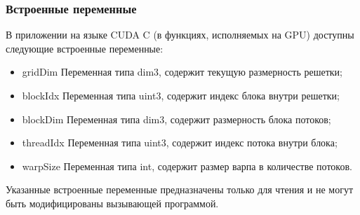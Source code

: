 \documentclass[a4paper, final]{article}
\begin{document}
\subsubsection{Встроенные переменные} 
В приложении на языке CUDA C (в функциях, 
исполняемых на GPU) доступны следующие встроенные переменные:
\begin{itemize}
    \item gridDim Переменная типа dim3, содержит текущую размерность решетки; 
    \item blockIdx Переменная типа uint3, содержит индекс блока внутри решетки; 
    \item blockDim Переменная типа dim3, содержит размерность блока потоков;
    \item threadIdx Переменная типа uint3, содержит индекс потока внутри блока; 
    \item warpSize Переменная типа int, содержит размер варпа в количестве 
    потоков.
\end{itemize}
Указанные встроенные переменные предназначены только для чтения и не 
могут быть модифицированы вызывающей программой.
\end{document}
